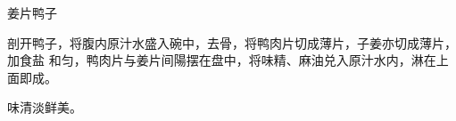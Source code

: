 \begin{recipe}{姜片鸭子}

\ingredients


\cooking

剖开鸭子，将腹内原汁水盛入碗中，去骨，将鸭肉片切成薄片，子姜亦切成薄片，加食盐
和匀，鸭肉片与姜片间陽摆在盘中，将味精、麻油兑入原汁水内，淋在上面即成。

\notes

味清淡鲜美。

\end{recipe}

